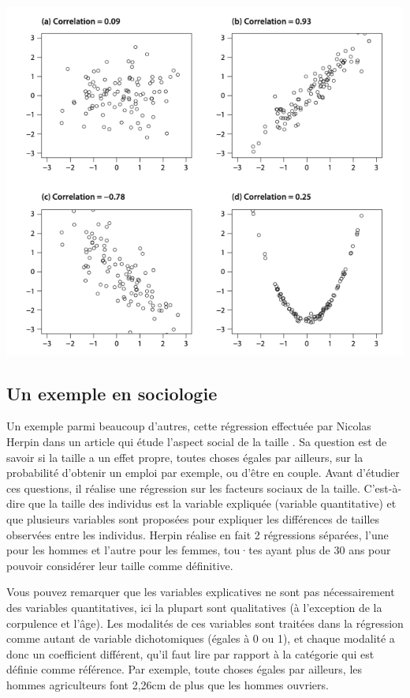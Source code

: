 \documentclass[
  french,
]{book}
\begin{document}
\includegraphics[width=10.78in]{images/correlations 2}

\hypertarget{un-exemple-en-sociologie}{%
\subsection{Un exemple en sociologie}\label{un-exemple-en-sociologie}}

Un exemple parmi beaucoup d'autres, cette régression effectuée par Nicolas Herpin dans un article qui étude l'aspect social de la taille \citep{herpin2003}. Sa question est de savoir si la taille a un effet propre, toutes choses égales par ailleurs, sur la probabilité d'obtenir un emploi par exemple, ou d'être en couple. Avant d'étudier ces questions, il réalise une régression sur les facteurs sociaux de la taille. C'est-à-dire que la taille des individus est la variable expliquée (variable quantitative) et que plusieurs variables sont proposées pour expliquer les différences de tailles observées entre les individus. Herpin réalise en fait 2 régressions séparées, l'une pour les hommes et l'autre pour les femmes, tou·tes ayant plus de 30 ans pour pouvoir considérer leur taille comme définitive.

Vous pouvez remarquer que les variables explicatives ne sont pas nécessairement des variables quantitatives, ici la plupart sont qualitatives (à l'exception de la corpulence et l'âge). Les modalités de ces variables sont traitées dans la régression comme autant de variable dichotomiques (égales à 0 ou 1), et chaque modalité a donc un coefficient différent, qu'il faut lire par rapport à la catégorie qui est définie comme référence. Par exemple, toute choses égales par ailleurs, les hommes agriculteurs font 2,26cm de plus que les hommes ouvriers.
\end{document}
